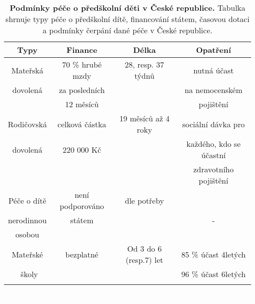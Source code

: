 \begin{spacing}{1.0}
\begin{table}[h!]
	\small
	\begin{center}
	\begin{tabular}{|c|c|c|c|}
		\hline
		\rowcolor{grey}
		\textbf{Typy}	 & \textbf{Finance}		& \textbf{Délka}		& \textbf{Opatření}	 \\
		\hline
		\hline
		Mateřská & 70 \% hrubé mzdy 		& 28, resp. 37 týdnů	& nutná účast  			\\ \rowcolor{grey!10}
		dovolená & za posledních	 		& 						& na nemocenském 		\\ \rowcolor{grey!10}
				 & 12 měsíců				& 						& pojištění				\\ \rowcolor{grey!10}
		\hline
		Rodičovská 	& celková částka  		& 19 měsíců až 4 roky	& sociální dávka pro 	\\ \rowcolor{grey!10}
		dovolená 	& 220 000 Kč			& 					& každého, kdo se účastní	\\ \rowcolor{grey!10}
					&						&						& zdravotního pojištění \\ \rowcolor{grey!10}
		\hline
		Péče o dítě & není podporováno		& dle potřeby			&   					\\ \rowcolor{grey!10}
		nerodinnou	& státem				&						&	-					\\ \rowcolor{grey!10}
		osobou 		&						&						&						\\ \rowcolor{grey!10}
		\hline
		Mateřské	& 	bezplatné 			& Od 3 do 6 (resp.7) let & 85 \% účast 4letých 	\\ \rowcolor{grey!10}\
		školy 		& 						&  						 & 96 \% účast 6letých 	\\ \rowcolor{grey!10}
		\hline
	\end{tabular}
	\end{center}
	\label{tab:peceCR}
	\caption{
		\textbf{Podmínky péče o předškolní děti v České republice.}
				Tabulka shrnuje typy péče o předškolní dítě, financování státem, časovou dotaci a podmínky čerpání dané péče v České republice.
	}
\end{table}
\end{spacing}	
\vspace{10cm}
\textcolor{white}{.}


